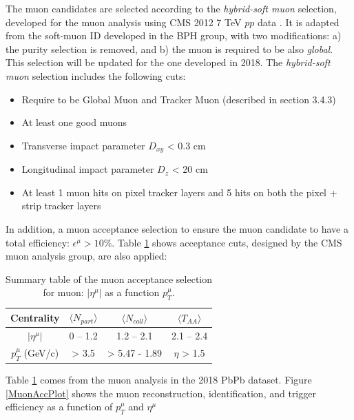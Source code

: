 The muon candidates are selected according to the \textit{hybrid-soft muon} selection, developed for the muon analysis using CMS 2012 7 TeV $pp$ data \cite{SoftMuon}. It is adapted from the soft-muon ID developed in the BPH group, with two modifications: a) the purity selection is removed, and b) the muon is required to be also \textit{global}. This selection will be updated for the one developed in 2018. The \textit{hybrid-soft muon} selection includes the following cuts:


\begin{itemize}
\item Require to be Global Muon and Tracker Muon (described in section 3.4.3)
\item At least one good muons 
\item Transverse impact parameter $D_{xy}$ < 0.3 cm
\item Longitudinal impact parameter $D_{z}$ < 20 cm
\item At least 1 muon hits on pixel tracker layers and 5 hits on both the pixel + strip tracker layers 
\end{itemize}

In addition, a muon acceptance selection to ensure the muon candidate to have a total efficiency: $\epsilon^\mu > 10\%$. Table \ref{MuonAccCut} shows acceptance cuts, designed by the CMS muon analysis group, are also applied:

\begin{table}[h]
\begin{center}
\caption{Summary table of the muon acceptance selection for muon: $|\eta^\mu|$ as a function $p_T^\mu$.}
\vspace{1em}
\label{MuonAccCut}
  \begin{tabular}{ |c | c| c| c|}
    \hline 
Centrality &  $\langle N_{part} \rangle$ &$\langle N_{coll} \rangle$  & $\langle T_{AA} \rangle$  \\
     \hline
         \hline
 $|\eta^\mu|$ & 0 -- 1.2   & 1.2 -- 2.1  &  2.1 -- 2.4   \\
$p_T^\mu$ (GeV/c) &  > 3.5 &  > 5.47 - 1.89 & $\eta$  > 1.5   \\
     \hline
    \hline
\end{tabular}
\end{center}
\end{table}

Table \ref{MuonAccCut} comes from the muon analysis in the 2018 PbPb dataset. Figure \ref{MuonAccPlot} shows the muon reconstruction, identification, and trigger efficiency as a function of $p_T^\mu$ and $\eta^{\mu}$ \cite{MuonAccRef}

